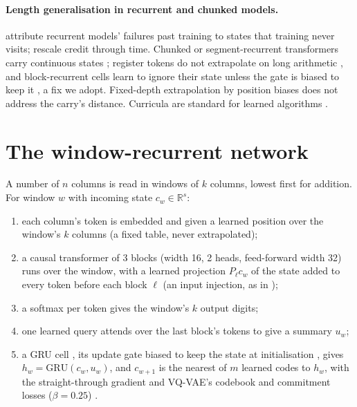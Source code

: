 \documentclass[11pt]{article}
\begin{document}
\paragraph{Length generalisation in recurrent and chunked models.}
\citet{buitrago-2025-length-generalization-recurrent-models} attribute recurrent models' failures
past training to states that training never visits; \citet{jiang-2026-length-extrapolatable-recurrent-models}
rescale credit through time. Chunked or segment-recurrent transformers carry continuous states
\citep{bulatov-2022-recurrent-memory-transformer,hutchins-2022-block-recurrent-transformers,ge-2026-register-tokens-bounded-state-reasoning};
register tokens do not extrapolate on long arithmetic \citep{ge-2026-register-tokens-bounded-state-reasoning},
and block-recurrent cells learn to ignore their state unless the gate is biased to keep it
\citep{hutchins-2022-block-recurrent-transformers}, a fix we adopt. Fixed-depth extrapolation by
position biases \citep{press-2022-alibi-train-short-test-long,sun-2022-xpos-length-extrapolatable-transformer}
does not address the carry's distance. Curricula are standard for learned algorithms
\citep{price-2016-neural-gpu-extensions-limitations,fan-2024-looped-transformers-length-generalization}.

\section{The window-recurrent network}
\label{sec:model}

A number of $n$ columns is read in windows of $k$ columns, lowest first for addition. For window
$w$ with incoming state $c_w \in \mathbb{R}^s$:
\begin{enumerate}
\item each column's token is embedded and given a learned position over the window's $k$ columns
  (a fixed table, never extrapolated);
\item a causal transformer \citep{vaswani-2017-attention} of 3 blocks (width 16, 2 heads,
  feed-forward width 32) runs over the window, with a learned projection $P_\ell c_w$ of the state
  added to every token before each block $\ell$ (an input injection, as in
  \citet{mcleish-2024-abacus-embeddings});
\item a softmax per token gives the window's $k$ output digits;
\item one learned query attends over the last block's tokens to give a summary $u_w$;
\item a GRU cell \citep{cho-2014-rnn-encoder-decoder-gru}, its update gate biased to keep the
  state at initialisation \citep{hutchins-2022-block-recurrent-transformers}, gives
  $h_w = \mathrm{GRU}(c_w, u_w)$, and $c_{w+1}$ is the nearest of $m$ learned codes to $h_w$, with
  the straight-through gradient and VQ-VAE's codebook and commitment losses ($\beta = 0.25$)
  \citep{van-den-oord-2017-vq-vae-neural-discrete-representation}.
\end{enumerate}
\end{document}

